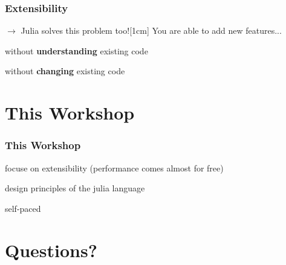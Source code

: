 \documentclass[notes]{beamer}
\def\\{}%
\newenvironment{wideitemize}{
    \itemize\addtolength{\itemsep}{15pt}\addtolength{\topsep}{10pt}}{\enditemize}
\begin{document}
    \begin{frame}
        \frametitle{Extensibility}
        $\rightarrow$ Julia solves this problem too!\\[1cm]
        You are able to add new features...
        \vspace{0.8cm}
        \begin{wideitemize}
            \item<1-> without \textbf{understanding} existing code
            \item<2-> without \textbf{changing} existing code
        \end{wideitemize}
    \end{frame}

	\section{This Workshop}

    \begin{frame}
        \frametitle{This Workshop}
        \begin{wideitemize}
            \item focuse on extensibility (performance comes almost for free)
            \item design principles of the julia language
            \item self-paced
        \end{wideitemize}
    \end{frame}

    \section{Questions?}
\end{document}
